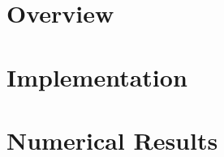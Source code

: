 
\maketitle





\newpage
\tableofcontents


\newpage
\section{Overview}


\newpage
\section{Implementation}


\newpage
\section{Numerical Results}


\newpage
{}

\printbibliography